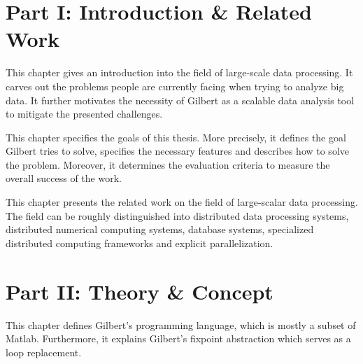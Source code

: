 \clearemptydoublepage

{}

\thispagestyle{empty}

\begin{center}
\end{center}

\section*{Part I: Introduction \& Related Work}


\noindent This chapter gives an introduction into the field of large-scale data processing. 
It carves out the problems people are currently facing when trying to analyze big data. 
It further motivates the necessity of Gilbert as a scalable data analysis tool to mitigate the presented challenges.

\vspace{1mm}


\noindent This chapter specifies the goals of this thesis. 
More precisely, it defines the goal Gilbert tries to solve, specifies the necessary features and describes how to solve the problem. 
Moreover, it determines the evaluation criteria to measure the overall success of the work.

\vspace{1mm}


\noindent This chapter presents the related work on the field of large-scalar data processing. 
The field can be roughly distinguished into distributed data processing systems, distributed numerical computing systems, database systems, specialized distributed computing frameworks and explicit parallelization.

\vspace{1mm}

\section*{Part II: Theory \& Concept}


\noindent This chapter defines Gilbert's programming language, which is mostly a subset of Matlab. 
Furthermore, it explains Gilbert's fixpoint abstraction which serves as a loop replacement.

